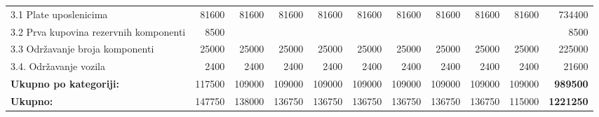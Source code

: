 \documentclass[12pt]{article}
\begin{document}
\begin{landscape}
\begin{table}[htbp]
\begin{tabular}{lrrrrrrrrrr}
    3.1 Plate uposlenicima & 81600 & 81600 & 81600 & 81600 & 81600 & 81600 & 81600 & 81600 & 81600 & 734400 \\
    \multicolumn{1}{p{14.715em}}{3.2 Prva kupovina rezervnih\newline{} komponenti} & 8500  &       &       &       &       &       &       &       &       & 8500 \\
    3.3 Održavanje broja komponenti & 25000 & 25000 & 25000 & 25000 & 25000 & 25000 & 25000 & 25000 & 25000 & 225000 \\
    3.4. Održavanje vozila & 2400  & 2400  & 2400  & 2400  & 2400  & 2400  & 2400  & 2400  & 2400  & 21600 \\
    \midrule
    \textbf{Ukupno po kategoriji:} & 117500 & 109000 & 109000 & 109000 & 109000 & 109000 & 109000 & 109000 & 109000 & \textbf{989500} \\
    \midrule
    \textbf{Ukupno:} & 147750 & 138000 & 136750 & 136750 & 136750 & 136750 & 136750 & 136750 & 115000 & \textbf{1221250} \\
    \bottomrule
    \end{tabular}%
  \label{tab:addlabel}%
\end{table}%

\end{landscape}
\end{document}
